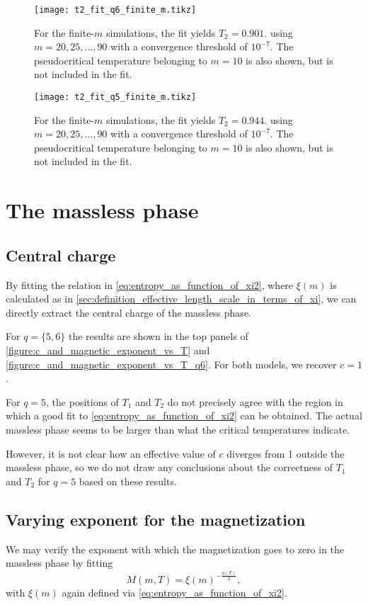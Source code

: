 \begin{figure}
  \centering
  \texttt{[image: t2\_fit\_q6\_finite\_m.tikz]}
  \caption{
  For the finite-$m$ simulations, the fit yields $T_2 = 0.901$.
  using $m = 20, 25, \dots,
  90$ with a convergence threshold of $10^{-7}$.
  The pseudocritical temperature belonging to $m = 10$ is also shown,
  but is not included in the fit.}\label{figure:t2_fit_q6_finite_m}
\end{figure}

\begin{figure}
  \centering
  \texttt{[image: t2\_fit\_q5\_finite\_m.tikz]}
  \caption{
  For the finite-$m$ simulations, the fit yields $T_2 = 0.944$.
  using $m = 20, 25, \dots,
  90$ with a convergence threshold of $10^{-7}$.
  The pseudocritical temperature belonging to $m = 10$ is also shown,
  but is not included in the fit.}\label{figure:t2_fit_q5_finite_m}
\end{figure}

\section{The massless phase}

\subsection{Central charge}\label{sec:central_charge_massless_phase}

By fitting the relation in \autoref{eq:entropy_as_function_of_xi2},
where $\xi(m)$ is calculated as in \autoref{sec:definition_effective_length_scale_in_terms_of_xi},
we can directly extract the central charge of the massless phase.

For $q = \{5, 6\}$ the results are shown in the top panels of \autoref{figure:c_and_magnetic_exponent_vs_T} and
\autoref{figure:c_and_magnetic_exponent_vs_T_q6}.
For both models, we recover $c = 1$.

For $q = 5$, the positions of $T_1$ and $T_2$ do not precisely agree with the region in which a good fit to
\autoref{eq:entropy_as_function_of_xi2} can be obtained.
The actual massless phase seems to be larger than what the critical temperatures indicate.

However, it is not clear how an effective value of $c$ diverges from 1 outside the massless phase,
so we do not draw any conclusions about the correctness of $T_1$ and $T_2$ for $q = 5$ based on these results.

\subsection{Varying exponent for the magnetization}
We may verify the exponent with which the magnetization goes to zero in the massless phase by fitting
\begin{equation}\label{eq:magnetization_scaling_massless_phase}
  M(m, T) = \xi(m)^{-\frac{\eta(T)}{2}},
\end{equation}
with $\xi(m)$ again defined via \autoref{eq:entropy_as_function_of_xi2}.

